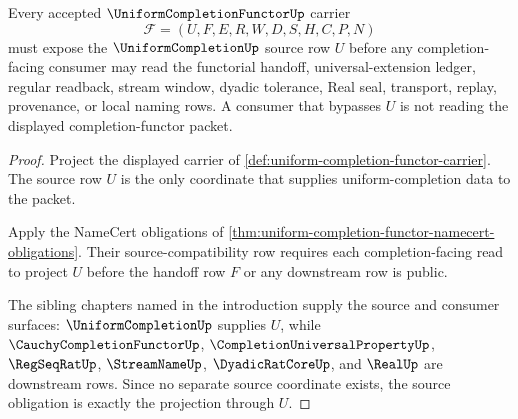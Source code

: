 \begin{theorem}
\label{thm:uniformcompletionfunctor-source-obligation}
Every accepted $\UniformCompletionFunctorUp$ carrier
$$
\mathcal{F}=(U,F,E,R,W,D,S,H,C,P,N)
$$
must expose the $\UniformCompletionUp$ source row $U$ before any completion-facing consumer may read the functorial handoff, universal-extension ledger, regular readback, stream window, dyadic tolerance, Real seal, transport, replay, provenance, or local naming rows. A consumer that bypasses $U$ is not reading the displayed completion-functor packet.
\end{theorem}
\begin{proof}
Project the displayed carrier of \autoref{def:uniform-completion-functor-carrier}. The source row $U$ is the only coordinate that supplies uniform-completion data to the packet.

Apply the NameCert obligations of \autoref{thm:uniform-completion-functor-namecert-obligations}. Their source-compatibility row requires each completion-facing read to project $U$ before the handoff row $F$ or any downstream row is public.

The sibling chapters named in the introduction supply the source and consumer surfaces: $\UniformCompletionUp$ supplies $U$, while $\CauchyCompletionFunctorUp$, $\CompletionUniversalPropertyUp$, $\RegSeqRatUp$, $\StreamNameUp$, $\DyadicRatCoreUp$, and $\RealUp$ are downstream rows. Since no separate source coordinate exists, the source obligation is exactly the projection through $U$.
\end{proof}

